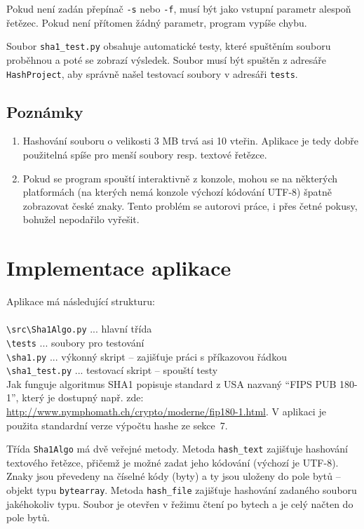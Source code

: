 \documentclass[a4paper]{article}
\begin{document}
Pokud není zadán přepínač \verb|-s| nebo \verb|-f|, musí být jako vstupní parametr alespoň řetězec. Pokud není přítomen žádný parametr, program vypíše chybu.

Soubor \verb|sha1_test.py| obsahuje automatické testy, které spuštěním souboru proběhnou a poté se zobrazí výsledek. Soubor musí být spuštěn z adresáře \texttt{HashProject}, aby správně našel testovací soubory v adresáři \verb|tests|.

\subsection{Poznámky}
\begin{enumerate}
\item Hashování souboru o velikosti 3 MB trvá asi 10 vteřin. Aplikace je tedy dobře použitelná spíše pro menší soubory resp. textové řetězce.
\item Pokud se program spouští interaktivně z konzole, mohou se na některých platformách (na kterých nemá konzole výchozí kódování UTF-8) špatně zobrazovat české znaky. Tento problém se autorovi práce, i přes četné pokusy, bohužel nepodařilo vyřešit.
\end{enumerate}


\section{Implementace aplikace}
Aplikace má následující strukturu:
\\ \\
\verb|\src\Sha1Algo.py| ... hlavní třída \\
\verb|\tests| ... soubory pro testování \\
\verb|\sha1.py| ... výkonný skript -- zajišťuje práci s příkazovou řádkou \\
\verb|\sha1_test.py| ... testovací skript -- spouští testy \\

Jak funguje algoritmus SHA1 popisuje standard z USA nazvaný ``FIPS PUB 180-1'', který je dostupný např. zde: \url{http://www.nymphomath.ch/crypto/moderne/fip180-1.html}. V aplikaci je použita standardní verze výpočtu hashe ze sekce~7. 

Třída \verb|Sha1Algo| má dvě veřejné metody. Metoda \verb|hash_text| zajišťuje hashování textového řetězce, přičemž je možné zadat jeho kódování (výchozí je UTF-8). Znaky jsou převedeny na číselné kódy (byty) a ty jsou uloženy do pole bytů -- objekt typu \texttt{bytearray}. 
Metoda \verb|hash_file| zajišťuje hashování zadaného souboru jakéhokoliv typu. Soubor je otevřen v řežimu čtení po bytech a je celý načten do pole bytů. 
\end{document}
